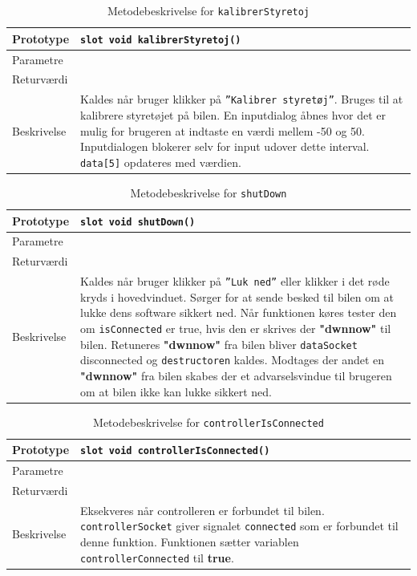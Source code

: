 \begin{table}[H]
\begin{tabularx}{\textwidth}{| L{2.5 cm} | Z |} \hline
Prototype & \texttt{slot void kalibrerStyretoj()} \\\hline
Parametre &   \\\hline
Returværdi &  \\\hline
Beskrivelse & Kaldes når bruger klikker på \texttt{''Kalibrer styretøj''}. Bruges til at kalibrere styretøjet på bilen. En inputdialog åbnes hvor det er mulig for brugeren at indtaste en værdi mellem -50 og 50. Inputdialogen blokerer selv for input udover dette interval. \texttt{data[5]} opdateres med værdien. \\\hline
\end{tabularx}
\caption{Metodebeskrivelse for \texttt{kalibrerStyretoj}}
\label{table:met_kalibrerStyretoj}
\end{table}

\begin{table}[H]
\begin{tabularx}{\textwidth}{| L{2.5 cm} | Z |} \hline
Prototype & \texttt{slot void shutDown()} \\\hline
Parametre &   \\\hline
Returværdi &  \\\hline
Beskrivelse & Kaldes når bruger klikker på \texttt{''Luk ned''} eller klikker i det røde kryds i hovedvinduet. Sørger for at sende besked til bilen om at lukke dens software sikkert ned. Når funktionen køres tester den om \texttt{isConnected} er true, hvis den er skrives der \textbf{"dwnnow"} til bilen. Retuneres \textbf{"dwnnow"} fra bilen bliver \texttt{dataSocket} disconnected og \texttt{destructoren} kaldes. Modtages der andet en \textbf{"dwnnow"} fra bilen skabes der et advarselsvindue til brugeren om at bilen ikke kan lukke sikkert ned. \\\hline
\end{tabularx}
\caption{Metodebeskrivelse for \texttt{shutDown}}
\label{table:met_shutDown}
\end{table}

\begin{table}[H]
\begin{tabularx}{\textwidth}{| L{2.5 cm} | Z |} \hline
Prototype & \texttt{slot void controllerIsConnected()} \\\hline
Parametre &   \\\hline
Returværdi &  \\\hline
Beskrivelse & Eksekveres når controlleren er forbundet til bilen. \texttt{controllerSocket} giver signalet \texttt{connected} som er forbundet til denne funktion. Funktionen sætter variablen \texttt{controllerConnected} til \textbf{true}.   \\\hline
\end{tabularx}
\caption{Metodebeskrivelse for \texttt{controllerIsConnected}}
\label{table:met_controllerIsConnected}
\end{table}


